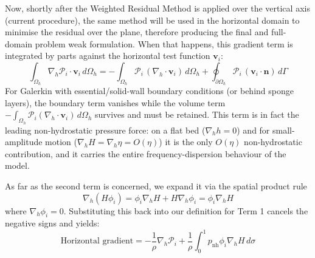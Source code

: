\documentclass{article}
\newcommand{\nablah}{\nabla_h}
\newcommand{\pnh}{p_{\text{nh}}}
\newcommand{\Pcol}{\mathcal{P}_i}
\newcommand{\vi}{\mathbf{v}_i}
\newcommand{\Oh}{\Omega_h}
\begin{document}
\begin{itemize}
\begin{itemize}[label=$\diamond$]
        Now, shortly after the Weighted Residual Method is applied over the vertical axis (current procedure), the same method will be used in the horizontal domain to minimise the residual over the plane, therefore producing the final and full-domain problem weak formulation.
        When that happens, this gradient term is integrated by parts against the horizontal test function $\vi$:
        $$\int_{\Oh} \nablah \Pcol \cdot \vi \, d\Oh = -\int_{\Oh} \Pcol \, (\nablah \cdot \vi) \, d\Oh + \oint_{\partial\Oh} \Pcol \, (\vi \cdot \mathbf{n}) \, d\Gamma$$
        For Galerkin with essential/solid-wall boundary conditions (or behind sponge layers), the boundary term vanishes while the volume term $-\int_{\Oh} \Pcol (\nablah\cdot\vi)\, d\Oh$ survives and must be retained.
        This term is in fact the leading non-hydrostatic pressure force: on a flat bed ($\nablah h = 0$) and for small-amplitude motion ($\nablah H = \nablah\eta = O(\eta)$) it is the only $O(\eta)$ non-hydrostatic contribution, and it carries the entire frequency-dispersion behaviour of the model.

        As far as the second term is concerned, we expand it via the spatial product rule
        $$\nablah (H \phi_i) = \phi_i \nablah H + H \nablah \phi_i = \phi_i \nablah H$$
        where $\nablah\phi_i = 0$.
        Substituting this back into our definition for Term 1 cancels the negative signs and yields:
        $$\text{Horizontal gradient} = -\frac{1}{\rho} \nablah \Pcol + \frac{1}{\rho} \int_0^1 \pnh \phi_i \nablah H \, d\sigma$$
    

\end{itemize}
\end{itemize}
\end{document}

